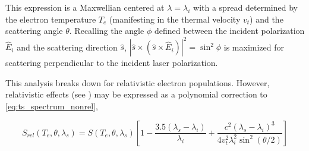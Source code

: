 \noindent This expression is a Maxwellian centered at $\lambda = \lambda_i$ with a spread determined by the electron temperature $T_e$ (manifesting in the thermal velocity $v_t$) and the scattering angle $\theta$.  Recalling the angle $\phi$ defined between the incident polarization $\hat{E}_i$ and the scattering direction $\hat{s}$, $\left|\hat{s} \times \left( \hat{s} \times \hat{E}_i \right) \right|^2 = \sin^2 \phi$ is maximized for scattering perpendicular to the incident laser polarization.

This analysis breaks down for relativistic electron populations.  However, relativistic effects (see \cite[\S 9]{Sheffield}) may be expressed as a polynomial correction to \cref{eq:ts_spectrum_nonrel},


\begin{equation}\label{eq:ts_spectrum_rel}
 S_{rel}(T_e,\theta,\lambda_s) = S(T_e,\theta,\lambda_s) \left[ 1 - \frac{3.5(\lambda_s - \lambda_i)}{\lambda_i} + \frac{c^2 (\lambda_s - \lambda_i)^3}{4v_t^2 \lambda_i^2 \sin^2 (\theta/2)}\right]
\end{equation}

\begin{figure}[t]
 \pushtooutside
\end{figure}

